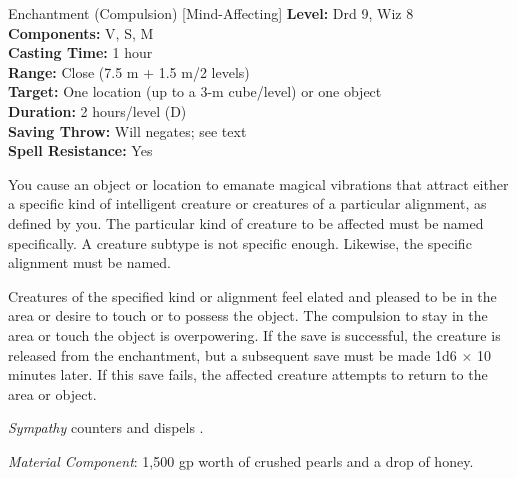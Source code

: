 {Enchantment (Compulsion) [Mind-Affecting]}
{
	\textbf{Level:}
	Drd 9, Wiz 8\\
	\textbf{Components:}
	V, S, M\\
	\textbf{Casting Time:}
	1 hour\\
	\textbf{Range:}
	Close (7.5 m + 1.5 m/2 levels)\\
	\textbf{Target:}
	One location (up to a 3-m cube/level) or one object\\
	\textbf{Duration:}
	2 hours/level (D)\\
	\textbf{Saving Throw:}
	Will negates; see text\\
	\textbf{Spell Resistance:}
	Yes\\
}
{
	You cause an object or location to emanate magical vibrations that attract either a specific kind of intelligent creature or creatures of a particular alignment, as defined by you. The particular kind of creature to be affected must be named specifically. A creature subtype is not specific enough. Likewise, the specific alignment must be named.

	Creatures of the specified kind or alignment feel elated and pleased to be in the area or desire to touch or to possess the object. The compulsion to stay in the area or touch the object is overpowering. If the save is successful, the creature is released from the enchantment, but a subsequent save must be made 1d6 $\times$ 10 minutes later. If this save fails, the affected creature attempts to return to the area or object.

	\emph{Sympathy} counters and dispels .

	\textit{Material Component}:
	1,500 gp worth of crushed pearls and a drop of honey.

}
